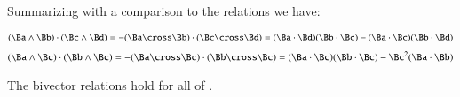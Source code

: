 Summarizing with a comparison to the  relations we have:

\begin{align}\label{eqn:bivector:boo2}
(\Ba \wedge \Bb) \cdot (\Bc \wedge \Bd) = -(\Ba \cross \Bb) \cdot (\Bc \cross \Bd) = ( \Ba \cdot \Bd ) ( \Bb \cdot \Bc ) - ( \Ba \cdot \Bc ) ( \Bb \cdot \Bd )
\end{align}
\begin{align}\label{eqn:bivector:boo3}
(\Ba \wedge \Bc) \cdot (\Bb \wedge \Bc) = -(\Ba \cross \Bc) \cdot (\Bb \cross \Bc) = ( \Ba \cdot \Bc ) ( \Bb \cdot \Bc ) - \Bc^2 ( \Ba \cdot \Bb )
\end{align}

The bivector relations hold for all of .

\EndNoBibArticle
